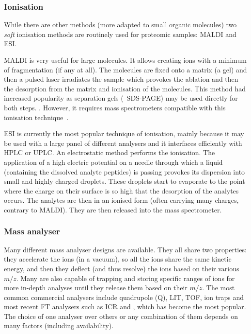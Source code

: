 \subsubsection{Ionisation}

While there are other methods (more adapted to small organic molecules)
two \emph{soft} ionisation methods are routinely used for proteomic samples:
\acrfull{MALDI} and \acrfull{ESI}.\mybr\

\gls{MALDI} is very useful for large molecules. It allows creating ions with a
minimum of fragmentation (if any at all). The molecules are fixed onto a matrix
(a gel) and then a pulsed \gls{laser} irradiates the sample which provokes the
ablation and then the desorption from the matrix and ionisation of the molecules.
This method had increased popularity as separation gels (\eg\ \gls{SDS-PAGE})
may be used directly for both steps. .
However, it requires mass spectrometers compatible
with this ionisation technique~.\mybr\

\gls{ESI} is currently the most popular technique of ionisation, mainly
because it may be used with a large panel of different analysers and it
interfaces efficiently with \gls{HPLC} or \gls{UPLC}.
An electrostatic method performs the ionisation.
The application of a high electric potential on
a needle through which a liquid (containing the dissolved analyte peptides)
is passing provokes its dispersion into small and highly charged droplets.
These droplets start to evaporate to the point where the charge on their surface
is so high that the desorption of the analytes occurs.
The analytes are then in an ionised form
(often carrying many charges, contrary to \gls{MALDI}).
They are then released into the mass spectrometer. \mybr\

\subsubsection{Mass analyser}

Many different mass analyser designs are available. They all share two properties:
they accelerate the ions (in a vacuum), so all the ions share the same kinetic
energy, and then they deflect (and thus resolve) the ions based on
their various $m/z$. Many are also
capable of trapping and storing specific ranges of ions for more in-depth analyses until
they release them based on their $m/z$.
The most common commercial analysers include quadrupole (Q), \acrfull{LIT},
\acrfull{TOF}, ion traps and most recent \gls{FT} analysers such as \acrfull{ICR}
and \orbi, which has become the most popular.
The choice of one analyser over others or any combination of them
depends on many factors (including availability).~\mybr\

